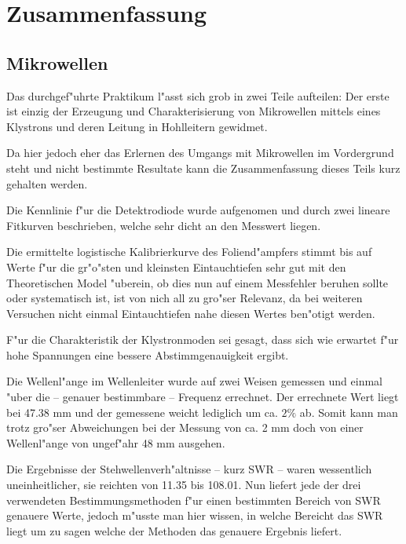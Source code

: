\documentclass[a4paper,12pt]{article}
\begin{document}
\clearpage

\section{Zusammenfassung}
\label{sec:zusammenfassung}


\subsection{Mikrowellen}
\label{sec:zusammenfassung_mikrowellen}

Das durchgef"uhrte Praktikum l"asst sich grob in zwei Teile aufteilen:
Der erste ist einzig der Erzeugung und Charakterisierung von
Mikrowellen mittels eines Klystrons und deren Leitung in Hohlleitern
gewidmet.

Da hier jedoch eher das Erlernen des Umgangs mit Mikrowellen im
Vordergrund steht und nicht bestimmte Resultate kann die
Zusammenfassung dieses Teils kurz gehalten werden.

Die Kennlinie f"ur die Detektrodiode wurde aufgenomen und durch zwei
lineare Fitkurven beschrieben, welche sehr dicht an den Messwert
liegen.

Die ermittelte logistische Kalibrierkurve des Foliend"ampfers stimmt
bis auf Werte f"ur die gr"o"sten und kleinsten Eintauchtiefen sehr gut
mit den Theoretischen Model "uberein, ob dies nun auf einem Messfehler
beruhen sollte oder systematisch ist, ist von nich all zu gro"ser
Relevanz, da bei weiteren Versuchen nicht einmal Eintauchtiefen nahe
diesen Wertes ben"otigt werden.

F"ur die Charakteristik der Klystronmoden sei gesagt, dass sich wie
erwartet f"ur hohe Spannungen eine bessere Abstimmgenauigkeit ergibt.

Die Wellenl"ange im Wellenleiter wurde auf zwei Weisen gemessen und
einmal "uber die -- genauer bestimmbare -- Frequenz errechnet. Der
errechnete Wert liegt bei 47.38 mm und der gemessene weicht lediglich
um ca. $2\%$ ab. Somit kann man trotz gro"ser Abweichungen bei der
Messung von ca. 2 mm doch von einer Wellenl"ange von ungef"ahr 48 mm
ausgehen.

Die Ergebnisse der Stehwellenverh"altnisse -- kurz SWR -- waren
wessentlich uneinheitlicher, sie reichten von 11.35 bis 108.01. Nun
liefert jede der drei verwendeten Bestimmungsmethoden f"ur einen
bestimmten Bereich von SWR genauere Werte, jedoch m"usste man hier
wissen, in welche Bereicht das SWR liegt um zu sagen welche der
Methoden das genauere Ergebnis liefert.
\end{document}
